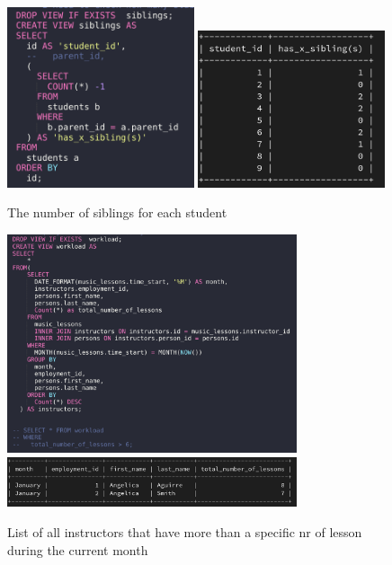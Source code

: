 \documentclass[a4paper]{scrreprt}
\begin{document}
\begin{figure}[h]
    \begin{center}
        \includegraphics[width=0.49\textwidth]{../img/siblingsSQL.png} 
        \includegraphics[width=0.49\textwidth]{../img/siblings.png}
        \caption{The number of siblings for each student}
        \label{fig:siblings}
    \end{center}
\end{figure}
\begin{figure}[h]
    \begin{center}
        \includegraphics[width=0.76\textwidth]{../img/workloadSQL.png} \\
        \includegraphics[width=0.76\textwidth]{../img/workload.png}
        \caption{List of all instructors that have more than a specific nr of lesson \\during the current month}
        \label{fig:workload}
    \end{center}
\end{figure}
\end{document}
